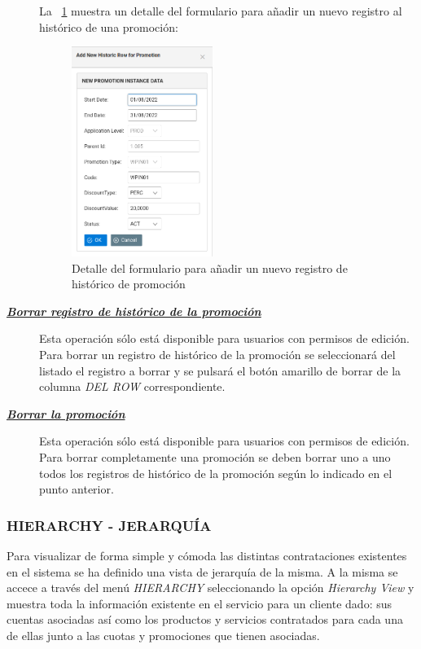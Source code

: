 \begin{description}
La \figurename~\ref{fig:nuevo-historico-promo} muestra un detalle del formulario para añadir un nuevo registro al histórico de una promoción:

\begin{figure}[H]
  \centering
  \includegraphics[width=0.45\textwidth]{imaxes/nuevo-historico-promocion.png}
  \caption{Detalle del formulario para añadir un nuevo registro de histórico de promoción}
  \label{fig:nuevo-historico-promo}
\end{figure}



\item[\underline{\textsl{\textbf{Borrar registro de histórico de la promoción}}}]
Esta operación sólo está disponible para usuarios con permisos de edición.
Para borrar un registro de histórico de la promoción se seleccionará del listado el registro a borrar y se pulsará el botón amarillo de borrar de la columna \textit{DEL ROW} correspondiente.

\item[\underline{\textsl{\textbf{Borrar la promoción}}}]
Esta operación sólo está disponible para usuarios con permisos de edición.
Para borrar completamente una promoción se deben borrar uno a uno todos los registros de histórico de la promoción según lo indicado en el punto anterior. 
\end{description}




\subsubsection{HIERARCHY - JERARQUÍA}

Para visualizar de forma simple y cómoda las distintas contrataciones existentes en el sistema se ha definido una vista de jerarquía de la misma. A la misma se accece a través del menú \emph{HIERARCHY} seleccionando la opción \emph{Hierarchy View} y muestra toda la información existente en el servicio para un cliente dado: sus cuentas asociadas así como los productos y servicios contratados para cada una de ellas junto a las cuotas y promociones que tienen asociadas.

